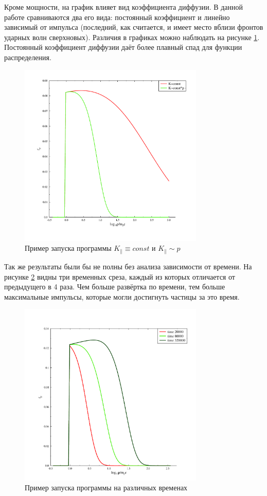 \documentclass[a4paper,14pt]{extarticle} %
\begin{document}
Кроме мощности, на график влияет вид коэффициента диффузии. В данной работе сравниваются два его вида: постоянный коэффициент и линейно зависимый от импульса (последний, как считается, и имеет место вблизи фронтов ударных волн сверхновых). Различия в графиках можно наблюдать на рисунке \ref{res/razn/bom}. Постоянный коэффициент диффузии даёт более плавный спад для функции распределения.

\begin{figure}[H]
\centering
\includegraphics[width=250pt]{r_bom_or_not2}
\caption{Пример запуска программы $K_\parallel\equiv const$ и $K_\parallel \sim p $}
\label{res/razn/bom}
\end{figure}

Так же результаты были бы не полны без анализа зависимости от времени. На рисунке \ref{res/razn/times} видны три временных среза, каждый из которых отличается от предыдущего в 4 раза. Чем больше развёртка по времени, тем больше максимальные импульсы, которые могли достигнуть частицы за это время.
\begin{figure}[H]
\centering
\includegraphics[width=250pt]{r_times}
\caption{Пример запуска программы на различных временах}
\label{res/razn/times}
\end{figure}
\end{document}
